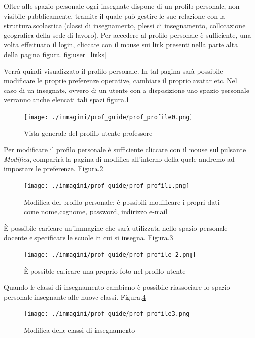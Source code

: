 Oltre allo spazio personale ogni insegnate dispone di un profilo personale, non visibile pubblicamente, tramite il quale può gestire le sue relazione con la struttura scolastica (classi di insegnamento, plessi di insegnamento, collocazione geografica della sede di lavoro). Per accedere al profilo personale è sufficiente, una volta effettuato il login, cliccare con il mouse sui link presenti nella parte alta della pagina figura.\ref{fig:user_links}

Verrà quindi visualizzato il profilo personale. In  tal pagina sarà possibile modificare le proprie preferenze operative, cambiare il proprio avatar etc. Nel caso di un insegnate, ovvero di un utente con a disposizione uno spazio personale verranno anche elencati tali spazi figura.\ref{fig:vista_profilo_utente}
\begin{figure}[h]
 \centering
 \texttt{[image: ./immagini/prof\_guide/prof\_profile0.png]}
 \caption{Vista generale del profilo utente professore}
 \label{fig:vista_profilo_utente}
\end{figure}

Per modificare il profilo personale è sufficiente cliccare con il mouse sul pulsante \textsl{Modifica}, comparirà la pagina di modifica all'interno della quale andremo ad impostare le preferenze. Figura.\ref{fig:profile_edit1}

\begin{figure}[H]
 \centering
 \texttt{[image: ./immagini/prof\_guide/prof\_profil1.png]}
 \caption{Modifica del profilo personale: è possibili modificare i propri dati come nome,cognome, password, indirizzo e-mail}
 \label{fig:profile_edit1}
\end{figure}
È possibile caricare un'immagine che sarà utilizzata nello spazio personale docente e specificare le scuole in cui si insegna. Figura.\ref{fig:profile_edit2}

\begin{figure}[H]
 \centering
 \texttt{[image: ./immagini/prof\_guide/prof\_profile\_2.png]}
 \caption{È possible caricare una  proprio foto nel profilo utente}
 \label{fig:profile_edit2}
\end{figure}
Quando le classi di insegnamento cambiano è possibile riassociare lo spazio personale insegnante alle nuove classi. Figura.\ref{fig:edit_profile3}

\begin{figure}[H]
 \centering
 \texttt{[image: ./immagini/prof\_guide/prof\_profile3.png]}
 \caption{Modifica delle classi di insegnamento}
 \label{fig:edit_profile3}
\end{figure}
